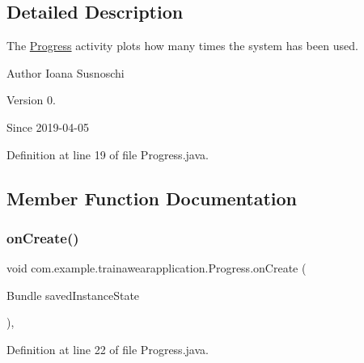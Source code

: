 \subsection{Detailed Description}
The \mbox{\hyperlink{classcom_1_1example_1_1trainawearapplication_1_1_progress}{Progress}} activity plots how many times the system has been used. 

\begin{DoxyAuthor}{Author}
Ioana Susnoschi 
\end{DoxyAuthor}
\begin{DoxyVersion}{Version}
0. 
\end{DoxyVersion}
\begin{DoxySince}{Since}
2019-\/04-\/05 
\end{DoxySince}


Definition at line 19 of file Progress.\+java.



\subsection{Member Function Documentation}
\mbox{\label{classcom_1_1example_1_1trainawearapplication_1_1_progress_a839ad2f2cb526d70b32c517f54400f36}} 
\subsubsection{\texorpdfstring{onCreate()}{onCreate()}}
{\footnotesize\ttfamily void com.\+example.\+trainawearapplication.\+Progress.\+on\+Create (\begin{DoxyParamCaption}\item[{Bundle}]{saved\+Instance\+State }\end{DoxyParamCaption})\hspace{0.3cm}{\ttfamily [inline]}, {\ttfamily [protected]}}



Definition at line 22 of file Progress.\+java.


\begin{DoxyCode}{0}

\end{DoxyCode}



